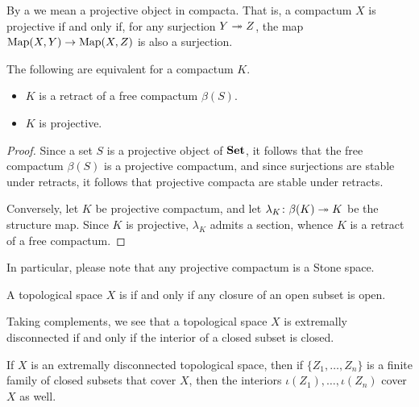 \begin{dfn}
	By a  we mean a projective object in compacta.
	That is, a compactum $ X $ is projective if and only if, for any surjection $ Y \twoheadrightarrow Z $, the map $ \operatorname{Map}(X, Y) \to \operatorname{Map}(X, Z) $ is also a surjection.
\end{dfn}

\begin{lem}
	The following are equivalent for a compactum $ K $.
	\begin{itemize}
		\item $ K $ is a retract of a free compactum $ \beta(S) $.
		\item $ K $ is projective.
	\end{itemize}
\end{lem}

\begin{proof}
	Since a set $ S $ is a projective object of $ \textbf{\textup{Set}} $, it follows that the free compactum $ \beta(S) $ is a projective compactum,
	and since surjections are stable under retracts, it follows that projective compacta are stable under retracts.

	Conversely, let $ K $ be projective compactum, and let $ \lambda_K \colon \beta(K) \twoheadrightarrow K $ be the structure map.
	Since $ K $ is projective, $ \lambda_K $ admits a section, whence $ K $ is a retract of a free compactum.
\end{proof}

\begin{nul}
	In particular, please note that any projective compactum is a Stone space.
\end{nul}

\begin{dfn}
	A topological space $ X $ is  if and only if any closure of an open subset is open.
\end{dfn}

\begin{nul}
	Taking complements, we see that a topological space $ X $ is extremally disconnected if and only if the interior of a closed subset is closed.
\end{nul}

\begin{lem}
	If $ X $ is an extremally disconnected topological space, then if $ \{ Z_1, \dots, Z_n \} $ is a finite family of closed subsets that cover $ X $, then the interiors $ \iota(Z_1), \dots, \iota(Z_n) $ cover $ X $ as well.
\end{lem}

